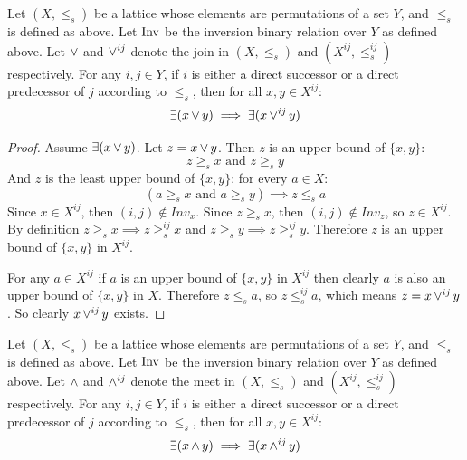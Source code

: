 	\begin{lemma}
		\label{identified-permutation-lattice-join}
		Let $(X, \le_s)$ be a lattice whose elements are permutations of a set $Y$, and $\le_s$ is defined as above. Let $\operatorname{Inv}$ be the inversion binary relation over $Y$ as defined above. Let $\operatorname{\vee}$ and $\operatorname{\vee}^{ij}$ denote the join in $(X, \le_s)$ and $(X^{ij}, \le^{ij}_s)$ respectively. For any $i,j \in Y$, if $i$ is either a direct successor or a direct predecessor of $j$ according to $\le_s$, then for all $x, y \in X^{ij}$:
		\[
			\exists(x \operatorname{\vee} y) \implies \exists(x \operatorname{\vee}^{ij} y)
		\]
	\end{lemma}

	\begin{proof}
		Assume $\exists(x \operatorname{\vee} y)$. Let $z = x \operatorname{\vee} y$. Then $z$ is an upper bound of $\{x, y\}$:
		\[
			z \ge_s x \textrm{ and } z \ge_s y
		\]
		And $z$ is the least upper bound of $\{x, y\}$: for every $a \in X$:
		\[
			(a \ge_s x \textrm{ and } a \ge_s y) \implies z \le_s a
		\]
		Since $x \in X^{ij}$, then $(i, j) \notin Inv_x$. Since $z \ge_s x$, then $(i, j) \notin Inv_z$, so $z \in X^{ij}$. By definition $z \ge_s x \implies z \ge^{ij}_s x$ and $z \ge_s y \implies z \ge^{ij}_s y$. Therefore $z$ is an upper bound of $\{x, y\}$ in $X^{ij}$.

		For any $a \in X^{ij}$ if $a$ is an upper bound of $\{x, y\}$ in $X^{ij}$ then clearly $a$ is also an upper bound of $\{x, y\}$ in $X$. Therefore $z \le_s a$, so $z \le^{ij}_s a$, which means $z = x \operatorname{\vee}^{ij} y$. So clearly $x \operatorname{\vee}^{ij} y$ exists.
	\end{proof}

	\begin{lemma}
		\label{identified-permutation-lattice-meet}
		Let $(X, \le_s)$ be a lattice whose elements are permutations of a set $Y$, and $\le_s$ is defined as above. Let $\operatorname{Inv}$ be the inversion binary relation over $Y$ as defined above. Let $\operatorname{\wedge}$ and $\operatorname{\wedge}^{ij}$ denote the meet in $(X, \le_s)$ and $(X^{ij}, \le^{ij}_s)$ respectively. For any $i,j \in Y$, if $i$ is either a direct successor or a direct predecessor of $j$ according to $\le_s$, then for all $x, y \in X^{ij}$:
		\[
			\exists(x \operatorname{\wedge} y) \implies \exists(x \operatorname{\wedge}^{ij} y)
		\]
	\end{lemma}

